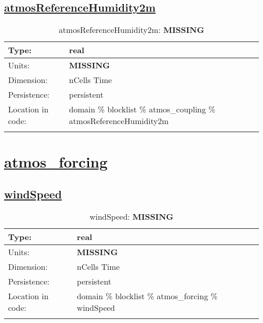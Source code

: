 \subsection[atmosReferenceHumidity2m]{\hyperref[sec:var_tab_atmos_coupling]{atmosReferenceHumidity2m}}
\label{subsec:var_sec_atmos_coupling_atmosReferenceHumidity2m}
\begin{center}
\begin{longtable}{| p{2.0in} | p{4.0in} |}
        \hline 
        Type: & real \\
        \hline 
        Units: & {\bf \color{red} MISSING} \\
        \hline 
        Dimension: & nCells Time \\
        \hline 
        Persistence: & persistent \\
        \hline 
         Location in code: & domain \% blocklist \% atmos\_coupling \% atmosReferenceHumidity2m \\
         \hline 
    \caption{atmosReferenceHumidity2m: {\bf \color{red} MISSING}}
\end{longtable}
\end{center}
\section[atmos\_forcing]{\hyperref[sec:var_tab_atmos_forcing]{atmos\_forcing}}
\label{sec:var_sec_atmos_forcing}
\subsection[windSpeed]{\hyperref[sec:var_tab_atmos_forcing]{windSpeed}}
\label{subsec:var_sec_atmos_forcing_windSpeed}
\begin{center}
\begin{longtable}{| p{2.0in} | p{4.0in} |}
        \hline 
        Type: & real \\
        \hline 
        Units: & {\bf \color{red} MISSING} \\
        \hline 
        Dimension: & nCells Time \\
        \hline 
        Persistence: & persistent \\
        \hline 
         Location in code: & domain \% blocklist \% atmos\_forcing \% windSpeed \\
         \hline 
    \caption{windSpeed: {\bf \color{red} MISSING}}
\end{longtable}
\end{center}
